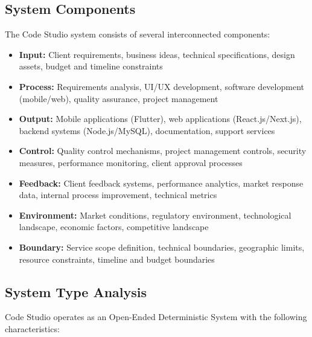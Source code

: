 \documentclass[12pt,a4paper]{article}
\begin{document}
\subsection{System Components}

The Code Studio system consists of several interconnected components:

\begin{itemize}
    \item \textbf{Input:} Client requirements, business ideas, technical specifications, design assets, budget and timeline constraints
    \item \textbf{Process:} Requirements analysis, UI/UX development, software development (mobile/web), quality assurance, project management
    \item \textbf{Output:} Mobile applications (Flutter), web applications (React.js/Next.js), backend systems (Node.js/MySQL), documentation, support services
    \item \textbf{Control:} Quality control mechanisms, project management controls, security measures, performance monitoring, client approval processes
    \item \textbf{Feedback:} Client feedback systems, performance analytics, market response data, internal process improvement, technical metrics
    \item \textbf{Environment:} Market conditions, regulatory environment, technological landscape, economic factors, competitive landscape
    \item \textbf{Boundary:} Service scope definition, technical boundaries, geographic limits, resource constraints, timeline and budget boundaries
\end{itemize}

\subsection{System Type Analysis}

Code Studio operates as an Open-Ended Deterministic System with the following characteristics:
\end{document}
